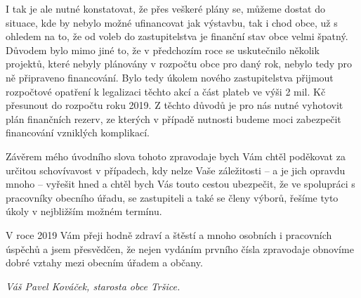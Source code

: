 \documentclass{article}
\begin{document}
\begin{multicols}{3}
{I tak je ale nutné konstatovat, že přes veškeré plány se, můžeme dostat do situace, kde by nebylo možné ufinancovat jak výstavbu, tak i chod obce, už s ohledem na to, že od voleb do zastupitelstva je finanční stav obce velmi špatný. Důvodem bylo mimo jiné to, že v předchozím roce se uskutečnilo několik projektů, které nebyly plánovány v rozpočtu obce pro daný rok, nebylo tedy pro ně připraveno financování. Bylo tedy úkolem nového zastupitelstva přijmout rozpočtové opatření k legalizaci těchto akcí a část plateb ve výši 2 mil. Kč přesunout do rozpočtu roku 2019. Z těchto důvodů je pro nás nutné vyhotovit plán finančních rezerv, ze kterých v případě nutnosti budeme moci zabezpečit financování vzniklých komplikací.

Závěrem mého úvodního slova tohoto zpravodaje bych Vám chtěl poděkovat za určitou schovívavost v případech, kdy nelze Vaše záležitosti – a je jich opravdu mnoho – vyřešit hned a chtěl bych Vás touto cestou ubezpečit, že ve spolupráci s pracovníky obecního úřadu, se zastupiteli a také se členy výborů, řešíme tyto úkoly v nejbližším možném termínu.

V roce 2019 Vám přeji hodně zdraví a štěstí a mnoho osobních i pracovních úspěchů a jsem přesvědčen, že nejen vydáním prvního čísla zpravodaje obnovíme dobré vztahy mezi obecním úřadem a občany.

\emph{Váš Pavel Kováček, starosta obce Tršice.}
}\end{multicols}

\closearticle
\end{document}
